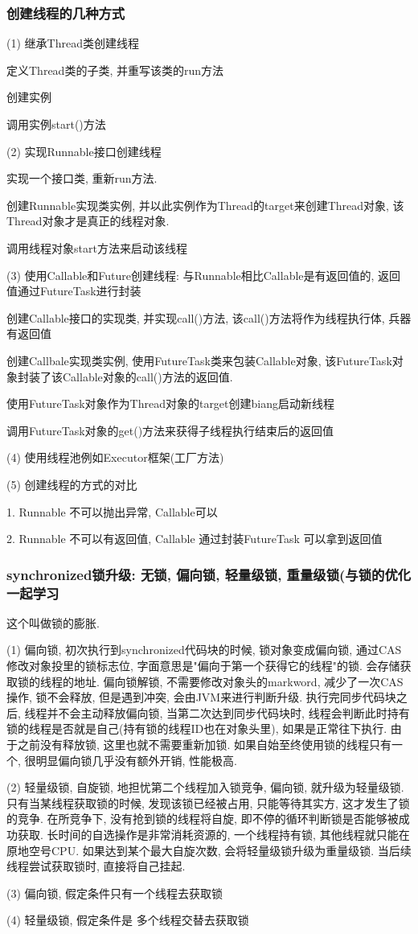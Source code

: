 \documentclass[UTF8]{ctexart}
\begin{document}
\subsubsection{创建线程的几种方式}
(1) 继承Thread类创建线程 \par
定义Thread类的子类, 并重写该类的run方法\par
创建实例\par
调用实例start()方法 \par
(2) 实现Runnable接口创建线程 \par
实现一个接口类, 重新run方法. \par
创建Runnable实现类实例, 并以此实例作为Thread的target来创建Thread对象, 该Thread对象才是真正的线程对象. \par
调用线程对象start方法来启动该线程\par
(3) 使用Callable和Future创建线程: 与Runnable相比Callable是有返回值的, 返回值通过FutureTask进行封装 \par
创建Callable接口的实现类, 并实现call()方法, 该call()方法将作为线程执行体, 兵器有返回值 \par
创建Callbale实现类实例, 使用FutureTask类来包装Callable对象, 该FutureTask对象封装了该Callable对象的call()方法的返回值. \par
使用FutureTask对象作为Thread对象的target创建biang启动新线程\par
调用FutureTask对象的get()方法来获得子线程执行结束后的返回值 \par
(4) 使用线程池例如Executor框架(工厂方法) \par
(5) 创建线程的方式的对比\par
1. Runnable 不可以抛出异常, Callable可以 \par
2. Runnable 不可以有返回值, Callable 通过封装FutureTask 可以拿到返回值 \par
\subsubsection{synchronized锁升级: 无锁, 偏向锁, 轻量级锁, 重量级锁(与锁的优化一起学习}
这个叫做锁的膨胀. \par
(1) 偏向锁, 初次执行到synchronized代码块的时候, 锁对象变成偏向锁, 通过CAS修改对象投里的锁标志位, 字面意思是"偏向于第一个获得它的线程"的锁. 会存储获取锁的线程的地址. 偏向锁解锁, 不需要修改对象头的markword, 减少了一次CAS操作, 锁不会释放, 但是遇到冲突, 会由JVM来进行判断升级. 执行完同步代码块之后, 线程并不会主动释放偏向锁, 当第二次达到同步代码块时, 线程会判断此时持有锁的线程是否就是自己(持有锁的线程ID也在对象头里), 如果是正常往下执行. 由于之前没有释放锁, 这里也就不需要重新加锁. 如果自始至终使用锁的线程只有一个, 很明显偏向锁几乎没有额外开销, 性能极高. \par
(2) 轻量级锁, 自旋锁, 地担忧第二个线程加入锁竞争, 偏向锁, 就升级为轻量级锁. 只有当某线程获取锁的时候, 发现该锁已经被占用, 只能等待其实方, 这才发生了锁的竞争. 在所竞争下, 没有抢到锁的线程将自旋, 即不停的循环判断锁是否能够被成功获取. 长时间的自选操作是非常消耗资源的, 一个线程持有锁, 其他线程就只能在原地空号CPU. 如果达到某个最大自旋次数, 会将轻量级锁升级为重量级锁. 当后续线程尝试获取锁时, 直接将自己挂起.\par
(3) 偏向锁, 假定条件只有一个线程去获取锁 \par
(4) 轻量级锁, 假定条件是 多个线程交替去获取锁 \par
\end{document}
